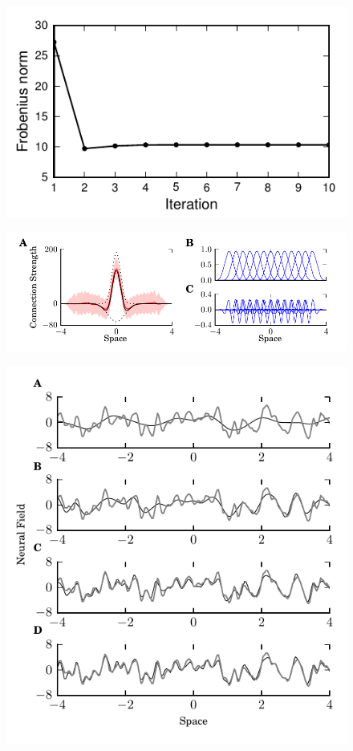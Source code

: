 \documentclass[review,authoryear,3p]{elsarticle}
\begin{document}
  \clearpage
  \newpage
  \begin{figure}[t]
   	\centering
   		\includegraphics[scale=1]{Graph/fig7.pdf}
   		\caption{} 
  \label{fig:MRA-Convergence}  
   \end{figure}  
   \clearpage
  \newpage
  \begin{figure}[!t]  
   \centering
  \includegraphics{Graph/fig8.pdf}
  \caption{}
  \label{fig:KernelEstimate}
  \end{figure}
  \clearpage
  \newpage
  \begin{figure}[!t]
  \centering
  \includegraphics{Graph/fig9.pdf}
  \caption{}
  \label{fig:FieldEstimates100}
  \end{figure}
\end{document}
